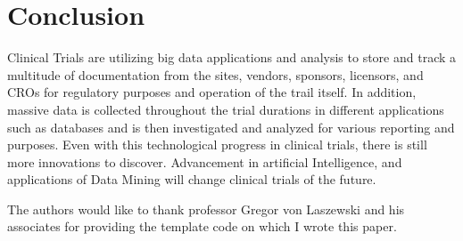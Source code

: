 \documentclass[sigconf]{acmart}
\begin{document}
\section{Conclusion} 
Clinical Trials are utilizing big data applications and analysis to store and track a multitude of documentation from the sites, vendors, sponsors, licensors, and CROs for regulatory purposes and operation of the trail itself. 
In addition, massive data is collected throughout the trial durations in different applications such as databases and is then investigated and analyzed for various reporting and purposes. 
Even with this technological progress in clinical trials, there is still more innovations to discover. 
Advancement in artificial Intelligence, and applications of Data Mining will change clinical trials of the future. 
 
\begin{acks}

The authors would like to thank professor Gregor von Laszewski and his associates for providing the template code on which I wrote this paper.

\end{acks}


 


\end{document}
